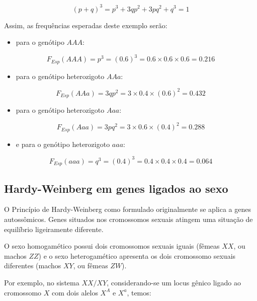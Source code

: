\documentclass[
]{book}
\providecommand{\tightlist}{%
  \setlength{\itemsep}{0pt}\setlength{\parskip}{0pt}}
\begin{document}
\[\left( p + q \right)^3 = p^3 + 3qp^2 + 3pq^2 + q^3 = 1\]

Assim, as frequências esperadas deste exemplo serão:

\begin{itemize}
\tightlist
\item
  para o genótipo \(AAA\):
\end{itemize}

\[F_{Esp}(AAA) = p^3 = (0.6)^3 = 0.6 \times 0.6 \times 0.6 = 0.216\]

\begin{itemize}
\tightlist
\item
  para o genótipo heterozigoto \(AAa\):
\end{itemize}

\[F_{Esp}(AAa) = 3qp^2 = 3 \times 0.4 \times (0.6)^2 = 0.432\]

\begin{itemize}
\tightlist
\item
  para o genótipo heterozigoto \(Aaa\):
\end{itemize}

\[F_{Esp}(Aaa) = 3pq^2 = 3 \times 0.6 \times (0.4)^2 = 0.288\]

\begin{itemize}
\tightlist
\item
  e para o genótipo heterozigoto \(aaa\):
\end{itemize}

\[F_{Esp}(aaa) = q^3 = (0.4)^3 = 0.4 \times 0.4 \times 0.4 = 0.064\]

\hypertarget{hardy-weinberg-em-genes-ligados-ao-sexo}{%
\subsection{Hardy-Weinberg em genes ligados ao sexo}\label{hardy-weinberg-em-genes-ligados-ao-sexo}}

O Princípio de Hardy-Weinberg como formulado originalmente se aplica a genes autossômicos. Genes situados nos cromossomos sexuais atingem uma situação de equilíbrio ligeiramente diferente.

O sexo homogamético possui dois cromossomos sexuais iguais (fêmeas \(XX\), ou machos \(ZZ\)) e o sexo heterogamético apresenta os dois cromossomo sexuais diferentes (machos \(XY\), ou fêmeas \(ZW\)).

Por exemplo, no sistema \(XX/XY\), considerando-se um locus gênico ligado ao cromossomo \(X\) com dois alelos \(X^A\) e \(X^a\), temos:
\end{document}
